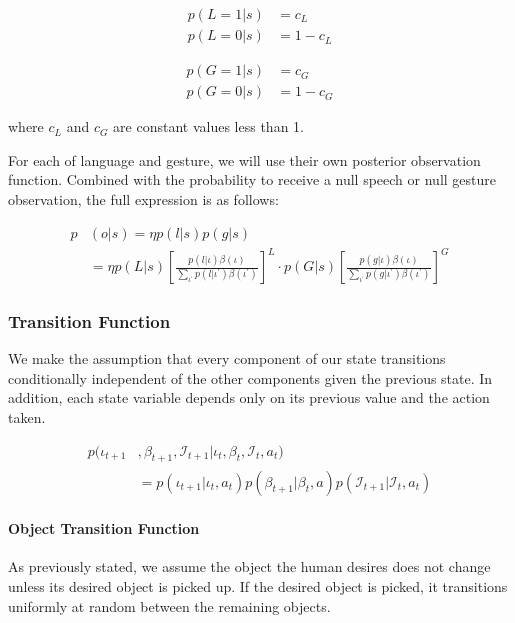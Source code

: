 \documentclass{article}
\newcommand{\Iota}{\mathcal{I}}
\begin{document}
\begin{multicols}{2}
\begin{align*}
	p(L = 1 | s) &= c_L \\
	p(L = 0 | s) &= 1 - c_L 
\end{align*}

\begin{align*}
	p(G = 1 | s) &= c_G \\
	p(G = 0 | s) &= 1 - c_G 
\end{align*}

where $c_L$ and $c_G$ are constant values less than 1. 

For each of language and gesture, we will use their own posterior observation function. Combined with the probability to receive a null speech or null gesture observation, the full expression is as follows: 



\begin{align*}
	p&(o|s) = \eta p(l|s) p(g|s)  \\
	&= \eta p(L|s) \left[ \frac{p(l|\iota) \beta(\iota)}{\sum_{\iota^\prime} p(l|\iota^\prime)\beta(\iota^\prime)} \right] ^ L \cdot p(G|s) \left[ \frac{p(g|\iota) \beta(\iota)}{\sum_{\iota^\prime} p(g|\iota^\prime)\beta(\iota^\prime)} \right]^G
\end{align*}




\subsubsection{Transition Function} \label{sssec:tf}

We make the assumption that every component of our state transitions conditionally independent of the other components given the previous state. In addition, each state variable depends only on its previous value and the action taken. 

\begin{align*}
	p(\iota_{t+1}&, \beta_{t+1}, \Iota_{t+1} | \iota_t, \beta_t, \Iota_t, a_t) \\
	&=  p(\iota_{t+1} | \iota_t, a_t) p(\beta_{t+1} | \beta_t, a) p(\Iota_{t+1} | \Iota_t, a_t)
\end{align*}

\paragraph{Object Transition Function}
As previously stated, we assume the object the human desires does not change unless its desired object is picked up. If the desired object is picked, it transitions uniformly at random between the remaining objects. 


\end{multicols}
\end{document}
